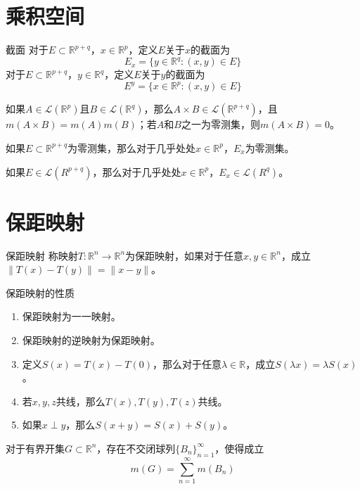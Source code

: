 \documentclass[lang = cn, scheme = chinese, thmcnt = section]{elegantbook}
\newcommand{\R}{\mathbb{R}}            %
\newcommand{\sub}{\subset}             %
\begin{document}
\section{乘积空间}

\begin{definition}{截面}
	对于$E\sub\R^{p+q}$，$x\in\R^{p}$，定义$E$关于$x$的截面为
	$$
	E_x=\{ y\in\R^{q}:(x,y)\in E \}
	$$
	对于$E\sub\R^{p+q}$，$y\in\R^{q}$，定义$E$关于$y$的截面为
	$$
	E^y=\{ x\in\R^{p}:(x,y)\in E \}
	$$
\end{definition}

\begin{theorem}
	如果$A\in\mathscr{L}(\R^p)$且$B\in\mathscr{L}(\R^q)$，那么$A\times B\in\mathscr{L}(\R^{p+q})$，且$m(A\times B)=m(A)m(B)$；若$A$和$B$之一为零测集，则$m(A\times B)=0$。
\end{theorem}

\begin{theorem}
	如果$E\sub\R^{p+q}$为零测集，那么对于几乎处处$x\in\R^p$，$E_x$为零测集。
\end{theorem}

\begin{theorem}
	如果$E\in\mathscr{L}(R^{p+q})$，那么对于几乎处处$x\in\R^p$，$E_x\in\mathscr{L}(R^{q})$。
\end{theorem}

\section{保距映射}

\begin{definition}{保距映射}
	称映射$T:\R^n\to\R^n$为保距映射，如果对于任意$x,y\in\R^n$，成立$\|T(x)-T(y)\|=\|x-y\|$。
\end{definition}

\begin{proposition}{保距映射的性质}
	\begin{enumerate}
		\item 保距映射为一一映射。
		\item 保距映射的逆映射为保距映射。
		\item 定义$S(x)=T(x)-T(0)$，那么对于任意$\lambda\in\R$，成立$S(\lambda x)=\lambda S(x)$。
		\item 若$x,y,z$共线，那么$T(x),T(y),T(z)$共线。
		\item 如果$x\perp y$，那么$S(x+y)=S(x)+S(y)$。
	\end{enumerate}
\end{proposition}

\begin{lemma}
	对于有界开集$G\sub\R^n$，存在不交闭球列$\{B_n\}_{n=1}^{\infty}$，使得成立
	$$
	m(G)=\sum_{n=1}^{\infty}{m(B_n)}
	$$
\end{lemma}
\end{document}
